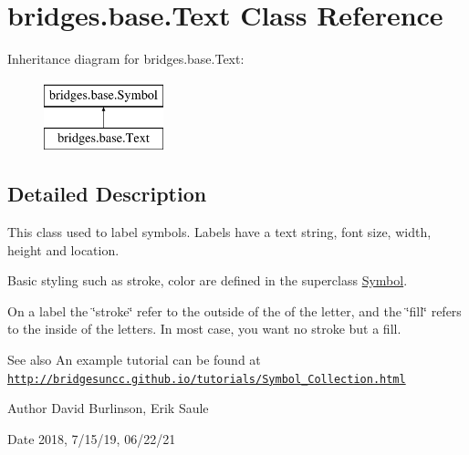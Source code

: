 \hypertarget{classbridges_1_1base_1_1_text}{}\section{bridges.\+base.\+Text Class Reference}
\label{classbridges_1_1base_1_1_text}
Inheritance diagram for bridges.\+base.\+Text\+:\begin{figure}[H]
\begin{center}
\leavevmode
\includegraphics[height=2.000000cm]{classbridges_1_1base_1_1_text}
\end{center}
\end{figure}


\subsection{Detailed Description}
This class used to label symbols. Labels have a text string, font size, width, height and location. 

Basic styling such as stroke, color are defined in the superclass \hyperlink{classbridges_1_1base_1_1_symbol}{Symbol}.

On a label the \char`\"{}stroke\char`\"{} refer to the outside of the of the letter, and the \char`\"{}fill\char`\"{} refers to the inside of the letters. In most case, you want no stroke but a fill.

\begin{DoxySeeAlso}{See also}
An example tutorial can be found at \href{http://bridgesuncc.github.io/tutorials/Symbol_Collection.html}{\tt http\+://bridgesuncc.\+github.\+io/tutorials/\+Symbol\+\_\+\+Collection.\+html}
\end{DoxySeeAlso}
\begin{DoxyAuthor}{Author}
David Burlinson, Erik Saule 
\end{DoxyAuthor}
\begin{DoxyDate}{Date}
2018, 7/15/19, 06/22/21 
\end{DoxyDate}

